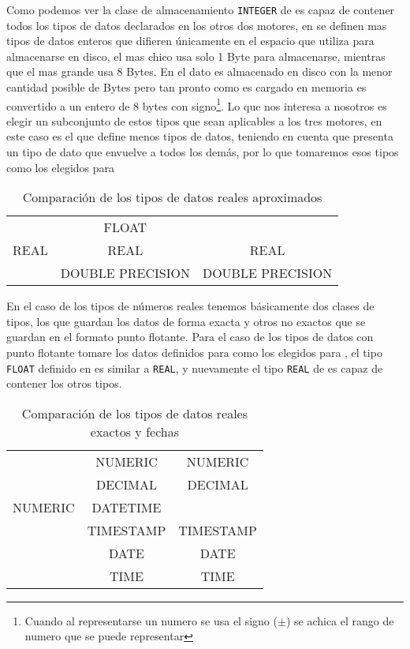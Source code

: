 Como podemos ver la clase de almacenamiento \verb=INTEGER= de \s es capaz de contener todos los tipos de datos declarados en los otros dos motores, en \m se definen mas tipos de datos enteros que  difieren únicamente en el espacio que utiliza para almacenarse en disco, el mas chico usa  solo 1 Byte para almacenarse, mientras que el mas grande usa 8 Bytes. En \s el dato es almacenado en disco con la menor cantidad posible de Bytes pero tan pronto como es cargado en memoria es convertido a un entero de 8 bytes con signo\footnote{Cuando al representarse un numero se usa el signo ($\pm$) se achica el rango de numero que se puede representar}. Lo que nos  interesa a nosotros es elegir un subconjunto de estos tipos que sean aplicables a los tres motores, en este caso es \p el que define menos tipos de datos, teniendo en cuenta que \s presenta un tipo de dato que envuelve a todos los demás, por lo que tomaremos esos tipos como los elegidos para \jj

\begin{table}[h]
\begin{center}
\begin{tabular}{|c|c|c|}
\hline \s   & \m               & \p \\  
\hline      & FLOAT            &  \\ 
       REAL & REAL             & REAL \\
            & DOUBLE PRECISION & DOUBLE PRECISION \\
\hline 
\end{tabular} 
\end{center}
\caption{Comparación de los tipos de datos reales aproximados}
\end{table}

En el caso de los tipos de números reales tenemos básicamente dos clases de tipos, los que guardan los datos de forma exacta y otros no exactos que se guardan en el formato punto flotante. Para el caso de los tipos de datos con punto flotante tomare los datos definidos para \p como los elegidos para \cc, el tipo \verb=FLOAT= definido en \m es similar a \verb=REAL=, y nuevamente el tipo \verb=REAL= de \s es capaz de contener los otros tipos. 

\begin{table}[h]
\begin{center}
\begin{tabular}{|c|c|c|}
\hline \s & \m & \p \\  
\hline  & NUMERIC & NUMERIC \\
  & DECIMAL & DECIMAL \\
NUMERIC  & DATETIME &  \\
  & TIMESTAMP & TIMESTAMP \\
  & DATE & DATE \\
  & TIME & TIME \\  
\hline 
\end{tabular} 
\end{center}
\caption{Comparación de los tipos de datos reales exactos y fechas}
\end{table}

